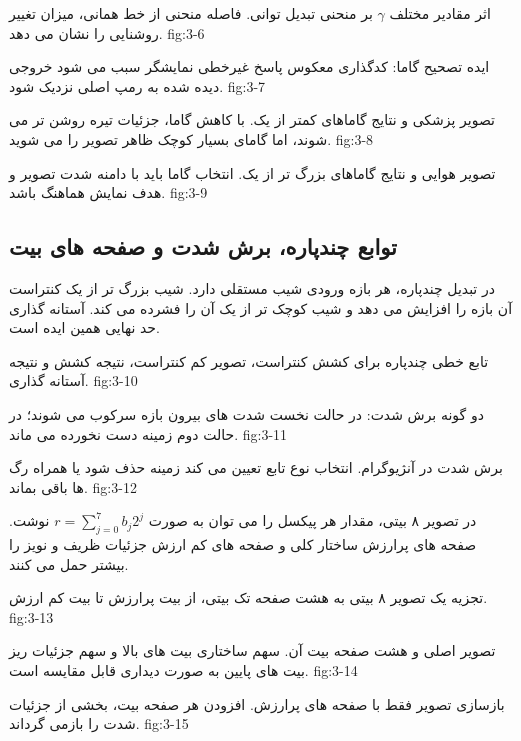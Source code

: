 {اثر مقادیر مختلف \(\gamma\) بر منحنی تبدیل توانی. فاصله منحنی از خط همانی،
میزان تغییر روشنایی را نشان می دهد.}
{fig:3-6}

{ایده تصحیح گاما: کدگذاری معکوس پاسخ غیرخطی نمایشگر سبب می شود خروجی دیده
شده به رمپ اصلی نزدیک شود.}
{fig:3-7}

{تصویر پزشکی و نتایج گاماهای کمتر از یک. با کاهش گاما، جزئیات تیره روشن تر
می شوند، اما گامای بسیار کوچک ظاهر تصویر را می شوید.}
{fig:3-8}

{تصویر هوایی و نتایج گاماهای بزرگ تر از یک. انتخاب گاما باید با دامنه شدت
تصویر و هدف نمایش هماهنگ باشد.}
{fig:3-9}

\subsection{توابع چندپاره، برش شدت و صفحه های بیت}

در تبدیل چندپاره، هر بازه ورودی شیب مستقلی دارد. شیب بزرگ تر از یک کنتراست
آن بازه را افزایش می دهد و شیب کوچک تر از یک آن را فشرده می کند. آستانه گذاری
حد نهایی همین ایده است.

{تابع خطی چندپاره برای کشش کنتراست، تصویر کم کنتراست، نتیجه کشش و نتیجه
آستانه گذاری.}
{fig:3-10}

{دو گونه برش شدت: در حالت نخست شدت های بیرون بازه سرکوب می شوند؛ در حالت
دوم زمینه دست نخورده می ماند.}
{fig:3-11}

{برش شدت در آنژیوگرام. انتخاب نوع تابع تعیین می کند زمینه حذف شود یا همراه
رگ ها باقی بماند.}
{fig:3-12}

در تصویر ۸ بیتی، مقدار هر پیکسل را می توان به صورت
\(r=\sum_{j=0}^{7}b_j2^j\) نوشت. صفحه های پرارزش ساختار کلی و صفحه های
کم ارزش جزئیات ظریف و نویز را بیشتر حمل می کنند.

{تجزیه یک تصویر ۸ بیتی به هشت صفحه تک بیتی، از بیت پرارزش تا بیت کم ارزش.}
{fig:3-13}

{تصویر اصلی و هشت صفحه بیت آن. سهم ساختاری بیت های بالا و سهم جزئیات ریز
بیت های پایین به صورت دیداری قابل مقایسه است.}
{fig:3-14}

{بازسازی تصویر فقط با صفحه های پرارزش. افزودن هر صفحه بیت، بخشی از جزئیات
شدت را بازمی گرداند.}
{fig:3-15}

